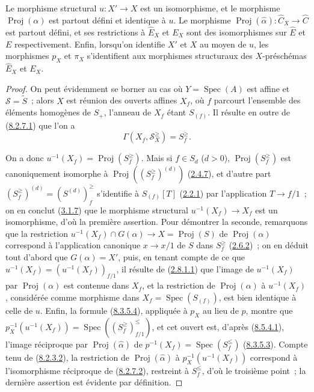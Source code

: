 \begin{proposition}[8.6.2]
\label{II.8.6.2-fr}
Le morphisme structural $u:X'\to X$ est un \textup{isomorphisme}, et le morphisme
$\operatorname{Proj}(\alpha)$ est partout défini et identique à $u$. Le
morphisme
$\operatorname{Proj}(\widehat{\alpha}):\widehat{C}_X\to\widehat{C}$ est
partout défini, et ses restrictions à $\widehat{E}_X$ et $E_X$ sont des
\textup{isomorphismes} sur $\widehat{E}$ et $E$ respectivement. Enfin, lorsqu'on
identifie $X'$ et $X$ au moyen de $u$, les morphismes $p_X$ et $\pi_X$
s'identifient aux morphismes structuraux des $X$-préschémas $\widehat{E}_X$ et
$E_X$.
\end{proposition}

\begin{proof}
On peut évidemment se borner au cas où $Y=\operatorname{Spec}(A)$ est affine
et $\mathcal{S}=\widetilde{S}$~; alors $X$ est réunion des ouverts affines
$X_f$, où $f$ parcourt l'ensemble des éléments homogènes de $S_+$, l'anneau
de $X_f$ étant $S_{(f)}$. Il résulte en outre de
(\hyperref[II.8.2.7.1-fr]{8.2.7.1}) que l'on a
\begin{equation}
\label{II.8.6.2.1-fr}
  \Gamma(X_f,\mathcal{S}_X^{\geq})=S_f^{\geq}.
\tag{8.6.2.1}
\end{equation}

On a donc $u^{-1}(X_f)=\operatorname{Proj}(S_f^{\geq})$. Mais si
$f\in S_d$ ($d>0$), $\operatorname{Proj}(S_f^{\geq})$ est canoniquement
isomorphe à $\operatorname{Proj}((S_f^{\geq})^{(d)})$
(\hyperref[II.2.4.7-fr]{2.4.7}), et d'autre part
$(S_f^{\geq})^{(d)}=(S^{(d)})_f^{\geq}$ s'identifie à $S_{(f)}[T]$
(\hyperref[II.2.2.1-fr]{2.2.1}) par l'application $T\to f/1$~; on en conclut
(\hyperref[II.3.1.7-fr]{3.1.7}) que le morphisme structural
$u^{-1}(X_f)\to X_f$ est un isomorphisme, d'où la première assertion. Pour
démontrer la seconde, remarquons que la restriction
$u^{-1}(X_f)\cap G(\alpha)\to X=\operatorname{Proj}(S)$ de
$\operatorname{Proj}(\alpha)$ correspond à l'application canonique
$x\to x/1$ de $S$ dans $S_f^{\geq}$
(\hyperref[II.2.6.2-fr]{2.6.2})~; on en déduit tout d'abord que
$G(\alpha)=X'$, puis, en tenant compte de ce que
$u^{-1}(X_f)=(u^{-1}(X_f))_{f/1}$, il résulte de
(\hyperref[II.2.8.1.1-fr]{2.8.1.1}) que l'image de $u^{-1}(X_f)$ par
$\operatorname{Proj}(\alpha)$ est contenue dans $X_f$, et la restriction de
$\operatorname{Proj}(\alpha)$ à $u^{-1}(X_f)$, considérée comme morphisme
dans $X_f=\operatorname{Spec}(S_{(f)})$, est bien identique à celle de $u$.
Enfin, la formule (\hyperref[II.8.3.5.4-fr]{8.3.5.4}), appliquée à $p_X$ au
lieu de $p$, montre que
$p_X^{-1}(u^{-1}(X_f))=
\operatorname{Spec}((S_f^{\geq})_{f/1}^{\leq})$, et cet ouvert est, d'après
(\hyperref[II.8.5.4.1-fr]{8.5.4.1}), l'image réciproque par
$\operatorname{Proj}(\widehat{\alpha})$ de
$p^{-1}(X_f)=\operatorname{Spec}(S_f^{\leq})$
(\hyperref[II.8.3.5.3-fr]{8.3.5.3}). Compte tenu de
(\hyperref[II.8.2.3.2-fr]{8.2.3.2}), la restriction de
$\operatorname{Proj}(\widehat{\alpha})$ à
$p_X^{-1}(u^{-1}(X_f))$ correspond à l'isomorphisme réciproque de
(\hyperref[II.8.2.7.2-fr]{8.2.7.2}), restreint à $S_f^{\leq}$, d'où le
troisième point~; la dernière assertion est évidente par définition.


\end{proof}
